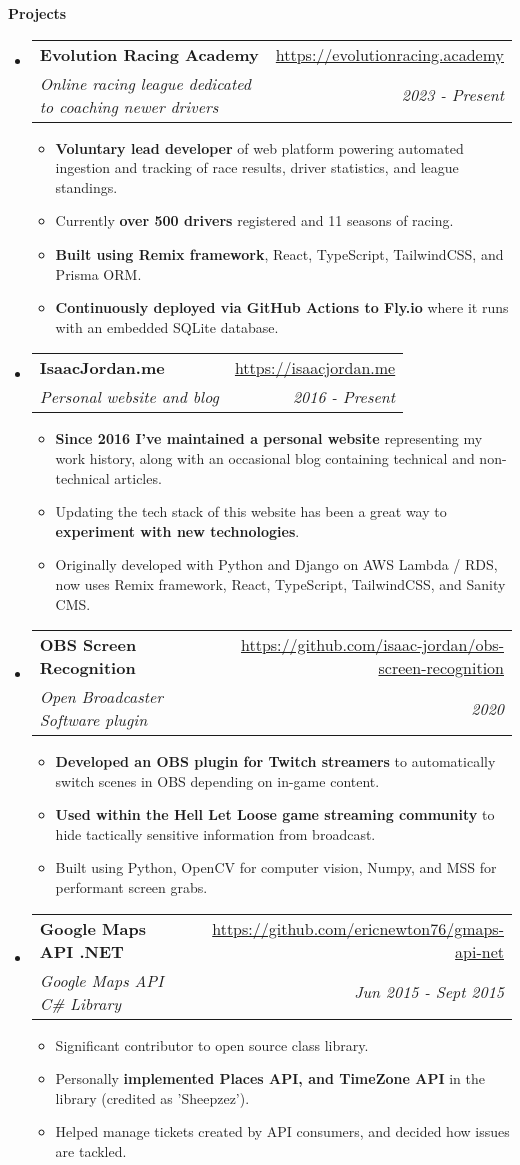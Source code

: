 \documentclass[letterpaper,11pt]{article}
\makeatletter
\newcommand{\resitem}[1]{\item #1 \vspace{-1pt}}
\newcommand{\resheading}[1]{{\large \colorbox{mygrey}{\begin{minipage}{\textwidth}{\textbf{#1 \vphantom{p\^{E}}}}\end{minipage}}}}
\newcommand{\ressubheading}[4]{
\begin{tabular*}{7.0in}{l@{\extracolsep{\fill}}r}
	\textbf{#1} & #2 \\
	\textit{#3} & \textit{#4} \\
\end{tabular*}\vspace{-6pt}}
\makeatother
\begin{document}
\resheading{Projects}
\begin{itemize}
	\item
		\ressubheading{Evolution Racing Academy}{\url{https://evolutionracing.academy}}
		{Online racing league dedicated to coaching newer drivers}{2023 - Present}
		\begin{itemize}
			\resitem{\textbf{Voluntary lead developer} of web platform powering automated ingestion and tracking of race results, driver statistics, and league standings.}
			\resitem{Currently \textbf{over 500 drivers} registered and 11 seasons of racing.}
			\resitem{\textbf{Built using Remix framework}, React, TypeScript, TailwindCSS, and Prisma ORM.}
			\resitem{\textbf{Continuously deployed via GitHub Actions to Fly.io} where it runs with an embedded SQLite database.}
		\end{itemize}

	\item
		\ressubheading{IsaacJordan.me}{\url{https://isaacjordan.me}}
		{Personal website and blog}{2016 - Present}
		\begin{itemize}
			\resitem{\textbf{Since 2016 I've maintained a personal website} representing my work history, along with an occasional blog containing technical and non-technical articles.}
			\resitem{Updating the tech stack of this website has been a great way to \textbf{experiment with new technologies}.}
			\resitem{Originally developed with Python and Django on AWS Lambda / RDS, now uses Remix framework, React, TypeScript, TailwindCSS, and Sanity CMS.}
		\end{itemize}

	\item
		\ressubheading{OBS Screen Recognition}{\url{https://github.com/isaac-jordan/obs-screen-recognition}}
		{Open Broadcaster Software plugin}{2020}
		\begin{itemize}
			\resitem{\textbf{Developed an OBS plugin for Twitch streamers} to automatically switch scenes in OBS depending on in-game content.}
			\resitem{\textbf{Used within the Hell Let Loose game streaming community} to hide tactically sensitive information from broadcast.}
			\resitem{Built using Python, OpenCV for computer vision, Numpy, and MSS for performant screen grabs.}
		\end{itemize}

	\item
		\ressubheading{Google Maps API .NET}{\url{https://github.com/ericnewton76/gmaps-api-net}}
		{Google Maps API C\# Library}{Jun 2015 - Sept 2015}
		\begin{itemize}
			\resitem{Significant contributor to open source class library.}
			\resitem{Personally \textbf{implemented Places API, and TimeZone API} in the library (credited as 'Sheepzez').}
			\resitem{Helped manage tickets created by API consumers, and decided how issues are tackled.}
		\end{itemize}

\end{itemize}
\end{document}
